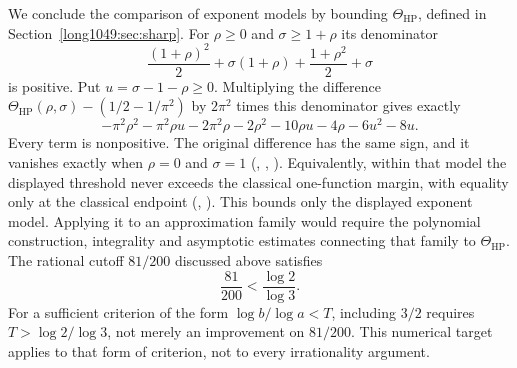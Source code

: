 \documentclass[11pt]{article}
\begin{document}
We conclude the comparison of exponent models by bounding
$\Theta_{\mathrm{HP}}$, defined in Section~\ref{long1049:sec:sharp}.
For $\rho\ge0$ and $\sigma\ge1+\rho$ its denominator
\[
 \frac{(1+\rho)^2}{2}+\sigma(1+\rho)+\frac{1+\rho^2}{2}+\sigma
\]
is positive. Put $u=\sigma-1-\rho\ge0$. Multiplying the difference
$\Theta_{\mathrm{HP}}(\rho,\sigma)-(1/2-1/\pi^2)$ by
$2\pi^2$ times this denominator gives exactly
\[
 -\pi^2\rho^2-\pi^2\rho u-2\pi^2\rho-2\rho^2-10\rho u
 -4\rho-6u^2-8u.
\]
Every term is nonpositive. The original difference has the same sign, and
it vanishes exactly when $\rho=0$ and $\sigma=1$
(,
,
).
Equivalently, within that model the displayed threshold never exceeds the
classical one-function margin, with equality only at the classical endpoint
(,
).
This bounds only the displayed exponent model. Applying it to an
approximation family would require the polynomial construction,
integrality and asymptotic estimates connecting that family to
$\Theta_{\mathrm{HP}}$.
The rational cutoff $81/200$ discussed above satisfies
\[
 \frac{81}{200}<\frac{\log2}{\log3}.
\]
For a sufficient criterion of the form $\log b/\log a<T$, including
$3/2$ requires $T>\log2/\log3$, not merely an improvement on
$81/200$. This numerical target applies to that form of criterion,
not to every irrationality argument.
\end{document}
